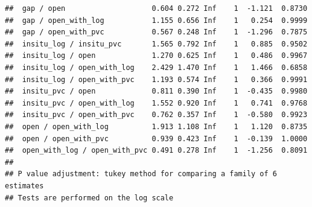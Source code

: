 \documentclass[
]{article}
\newenvironment{Shaded}{\begin{snugshade}}{\end{snugshade}}
\newcommand{\AttributeTok}[1]{\textcolor[rgb]{0.13,0.29,0.53}{#1}}
\newcommand{\CommentTok}[1]{\textcolor[rgb]{0.56,0.35,0.01}{\textit{#1}}}
\newcommand{\DecValTok}[1]{\textcolor[rgb]{0.00,0.00,0.81}{#1}}
\newcommand{\DocumentationTok}[1]{\textcolor[rgb]{0.56,0.35,0.01}{\textbf{\textit{#1}}}}
\newcommand{\FunctionTok}[1]{\textcolor[rgb]{0.13,0.29,0.53}{\textbf{#1}}}
\newcommand{\NormalTok}[1]{#1}
\newcommand{\OtherTok}[1]{\textcolor[rgb]{0.56,0.35,0.01}{#1}}
\newcommand{\SpecialCharTok}[1]{\textcolor[rgb]{0.81,0.36,0.00}{\textbf{#1}}}
\begin{document}
\begin{verbatim}
##  gap / open                    0.604 0.272 Inf    1  -1.121  0.8730
##  gap / open_with_log           1.155 0.656 Inf    1   0.254  0.9999
##  gap / open_with_pvc           0.567 0.248 Inf    1  -1.296  0.7875
##  insitu_log / insitu_pvc       1.565 0.792 Inf    1   0.885  0.9502
##  insitu_log / open             1.270 0.625 Inf    1   0.486  0.9967
##  insitu_log / open_with_log    2.429 1.470 Inf    1   1.466  0.6858
##  insitu_log / open_with_pvc    1.193 0.574 Inf    1   0.366  0.9991
##  insitu_pvc / open             0.811 0.390 Inf    1  -0.435  0.9980
##  insitu_pvc / open_with_log    1.552 0.920 Inf    1   0.741  0.9768
##  insitu_pvc / open_with_pvc    0.762 0.357 Inf    1  -0.580  0.9923
##  open / open_with_log          1.913 1.108 Inf    1   1.120  0.8735
##  open / open_with_pvc          0.939 0.423 Inf    1  -0.139  1.0000
##  open_with_log / open_with_pvc 0.491 0.278 Inf    1  -1.256  0.8091
## 
## P value adjustment: tukey method for comparing a family of 6 estimates 
## Tests are performed on the log scale
\end{verbatim}

\begin{Shaded}
\end{Shaded}
\end{document}
